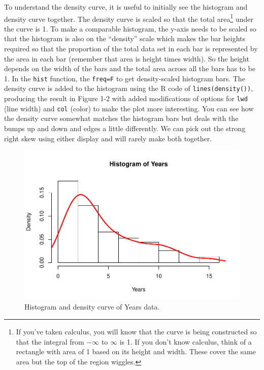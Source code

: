 \documentclass[]{book}
\newenvironment{Shaded}{\begin{snugshade}}{\end{snugshade}}
\newcommand{\KeywordTok}[1]{\textcolor[rgb]{0.13,0.29,0.53}{\textbf{{#1}}}}
\newcommand{\DataTypeTok}[1]{\textcolor[rgb]{0.13,0.29,0.53}{{#1}}}
\newcommand{\DecValTok}[1]{\textcolor[rgb]{0.00,0.00,0.81}{{#1}}}
\newcommand{\StringTok}[1]{\textcolor[rgb]{0.31,0.60,0.02}{{#1}}}
\newcommand{\NormalTok}[1]{{#1}}
\let\rmarkdownfootnote\footnote%
\def\footnote{\protect\rmarkdownfootnote}
\begin{document}
To understand the density curve, it is useful to initially see the
histogram and density curve together. The density curve is scaled so
that the total area\footnote{If you've taken calculus, you will know
  that the curve is being constructed so that the integral from
  \(-\infty\) to \(\infty\) is 1. If you don't know calculus, think of a
  rectangle with area of 1 based on its height and width. These cover
  the same area but the top of the region wiggles.} under the curve is
1. To make a comparable histogram, the y-axis needs to be scaled so that
the histogram is also on the ``density'' scale which makes the bar
heights required so that the proportion of the total data set in each
bar is represented by the area in each bar (remember that area is height
times width). So the height depends on the width of the bars and the
total area across all the bars has to be 1. In the \texttt{hist}
function, the \texttt{freq=F} to get density-scaled histogram bars. The
density curve is added to the histogram using the R code of
\texttt{lines(density())}, producing the result in Figure 1-2 with added
modifications of options for \texttt{lwd} (line width) and \texttt{col}
(color) to make the plot more interesting. You can see how the density
curve somewhat matches the histogram bars but deals with the bumps up
and down and edges a little differently. We can pick out the strong
right skew using either display and will rarely make both together.



\begin{Shaded}
\end{Shaded}

\begin{figure}[htbp]
\centering
\includegraphics{GreenwoodBanner_files/figure-latex/Figure2-2-1.pdf}
\caption{\label{fig:Figure2-2}Histogram and density curve of Years data.}
\end{figure}
\end{document}
